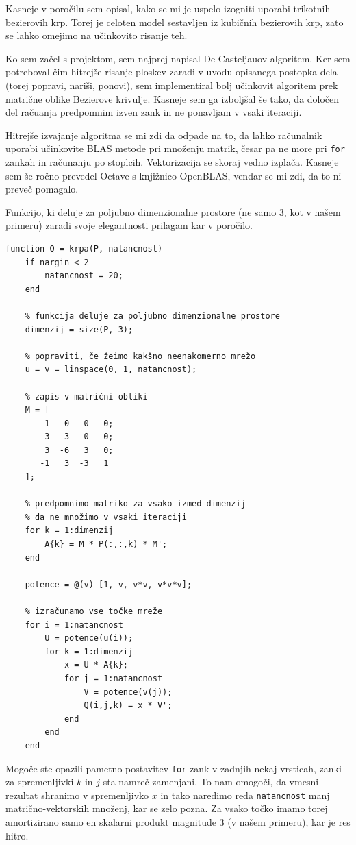 \documentclass[a4paper,11pt]{article}
\begin{document}
	Kasneje v poročilu sem opisal, kako se mi je uspelo izogniti uporabi trikotnih bezierovih krp. Torej je celoten model sestavljen iz kubičnih bezierovih krp, zato se lahko omejimo na učinkovito risanje teh.
	
	Ko sem začel s projektom, sem najprej napisal De Casteljauov algoritem. Ker sem potreboval čim hitrejše risanje ploskev zaradi v uvodu opisanega postopka dela (torej popravi, nariši, ponovi), sem implementiral bolj učinkovit algoritem prek matrične oblike Bezierove krivulje. Kasneje sem ga izboljšal še tako, da določen del račuanja predpomnim izven zank in ne ponavljam v vsaki iteraciji.
	
	Hitrejše izvajanje algoritma se mi zdi da odpade na to, da lahko računalnik uporabi učinkovite BLAS metode pri množenju matrik, česar pa ne more pri \texttt{for} zankah in računanju po stoplcih. Vektorizacija se skoraj vedno izplača. Kasneje sem še ročno prevedel Octave s knjižnico OpenBLAS, vendar se mi zdi, da to ni preveč pomagalo.
	
	Funkcijo, ki deluje za poljubno dimenzionalne prostore (ne samo 3, kot v našem primeru) zaradi svoje elegantnosti prilagam kar v poročilo.

\begin{verbatim}
function Q = krpa(P, natancnost)
	if nargin < 2
		natancnost = 20;
	end
	
	% funkcija deluje za poljubno dimenzionalne prostore
	dimenzij = size(P, 3);

	% popraviti, če žeimo kakšno neenakomerno mrežo
	u = v = linspace(0, 1, natancnost);

	% zapis v matrični obliki
	M = [
		1   0   0   0;
	   -3   3   0   0;
		3  -6   3   0;
	   -1   3  -3   1
	];
	
	% predpomnimo matriko za vsako izmed dimenzij
	% da ne množimo v vsaki iteraciji
	for k = 1:dimenzij
		A{k} = M * P(:,:,k) * M';
	end

	potence = @(v) [1, v, v*v, v*v*v];

	% izračunamo vse točke mreže
	for i = 1:natancnost
		U = potence(u(i));
		for k = 1:dimenzij
			x = U * A{k};
			for j = 1:natancnost
				V = potence(v(j));
				Q(i,j,k) = x * V';
			end
		end
	end
\end{verbatim}

Mogoče ste opazili pametno postavitev \texttt{for} zank v zadnjih nekaj vrsticah, zanki za spremenljivki $k$ in $j$ sta namreč zamenjani. To nam omogoči, da vmesni rezultat shranimo v spremenljivko $x$ in tako naredimo reda \texttt{natancnost} manj matrično-vektorskih množenj, kar se zelo pozna. Za vsako točko imamo torej amortizirano samo en skalarni produkt magnitude 3 (v našem primeru), kar je res hitro.
\end{document}
